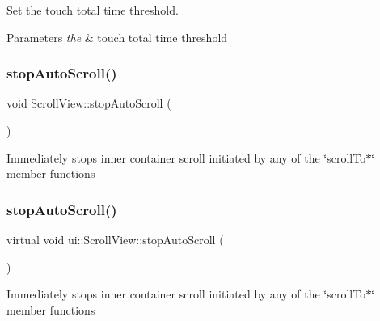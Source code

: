Set the touch total time threshold. 


\begin{DoxyParams}{Parameters}
{\em the} & touch total time threshold \\
\hline
\end{DoxyParams}
\mbox{\label{classui_1_1ScrollView_a1b7003ef22b8a25adc78211937f388d2}} 
\subsubsection{\texorpdfstring{stop\+Auto\+Scroll()}{stopAutoScroll()}\hspace{0.1cm}{\footnotesize\ttfamily [1/2]}}
{\footnotesize\ttfamily void Scroll\+View\+::stop\+Auto\+Scroll (\begin{DoxyParamCaption}{ }\end{DoxyParamCaption})\hspace{0.3cm}{\ttfamily [virtual]}}

Immediately stops inner container scroll initiated by any of the \char`\"{}scroll\+To$\ast$\char`\"{} member functions \mbox{\label{classui_1_1ScrollView_a183ef5bd2ed03ddf55cbedd81d984856}} 
\subsubsection{\texorpdfstring{stop\+Auto\+Scroll()}{stopAutoScroll()}\hspace{0.1cm}{\footnotesize\ttfamily [2/2]}}
{\footnotesize\ttfamily virtual void ui\+::\+Scroll\+View\+::stop\+Auto\+Scroll (\begin{DoxyParamCaption}{ }\end{DoxyParamCaption})\hspace{0.3cm}{\ttfamily [virtual]}}

Immediately stops inner container scroll initiated by any of the \char`\"{}scroll\+To$\ast$\char`\"{} member functions \mbox{\label{classui_1_1ScrollView_ac62682dffdbd0f1456aef372c13416ac}} 
